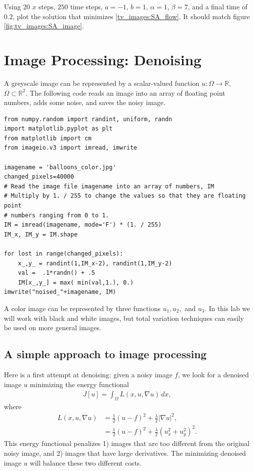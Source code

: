 \begin{problem}
Using $20$ $x$ steps, $250$ time steps, $a=-1$, $b=1$, $\alpha = 1$, $\beta=7$, and a final time of $0.2$, plot the solution that minimizes \eqref{tv_images:SA_flow}.
It should match figure \ref{fig:tv_images:SA_image}.

\end{problem}

\section*{Image Processing: Denoising}

A greyscale image can be represented by a scalar-valued function $u:\Omega \to \mathbb{R}$, $\Omega \subset \mathbb{R}^2$. The following code reads an image into an array of floating point numbers, adds some noise, and saves the noisy image.
\begin{lstlisting}
from numpy.random import randint, uniform, randn
import matplotlib.pyplot as plt
from matplotlib import cm
from imageio.v3 import imread, imwrite

imagename = 'balloons_color.jpg'
changed_pixels=40000
# Read the image file imagename into an array of numbers, IM
# Multiply by 1. / 255 to change the values so that they are floating point
# numbers ranging from 0 to 1.
IM = imread(imagename, mode='F') * (1. / 255)
IM_x, IM_y = IM.shape

for lost in range(changed_pixels):
    x_,y_ = randint(1,IM_x-2), randint(1,IM_y-2)
    val =  .1*randn() + .5
    IM[x_,y_] = max( min(val,1.), 0.)
imwrite("noised_"+imagename, IM)
\end{lstlisting}
A color image can be represented by three functions $u_1, u_2,$ and $u_3$. In this lab we will work with black and white images, but total variation techniques can easily be used on more general images.

\subsection*{A simple approach to image processing}
Here is a first attempt at denoising: given a noisy image $f$, we look for a denoised image $u$ minimizing the energy functional
\begin{align}
J[u] = \int_{\Omega} L(x,u,\nabla u) \, dx, \label{tv_images:diffusion}
\end{align}
where
\begin{align*}
L(x,u,\nabla u) &= \frac{1}{2}(u-f)^2 + \frac{\lambda}{2} | \nabla u|^2,\\
&= \frac{1}{2}(u-f)^2 + \frac{\lambda}{2} (u_x^2 + u_y^2)^2.
\end{align*}
This energy functional penalizes 1) images that are too different from the original noisy image, and 2) images that have large derivatives. The minimizing denoised image $u$ will balance these two different costs.

